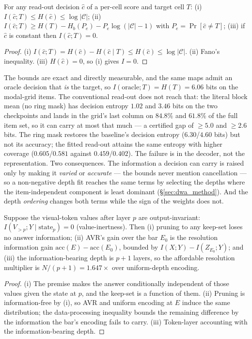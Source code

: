 \begin{theorem}\label{thm:info}
For any read-out decision $\hat c$ of a per-cell score and target cell $T$:
(i) $I(\hat c;T)\le H(\hat c)\le\log|\mathcal C|$;
(ii) $I(\hat c;T)\ge H(T)-H_b(P_e)-P_e\log(|\mathcal C|-1)$ with $P_e=\Pr[\hat c\ne T]$;
(iii) if $\hat c$ is constant then $I(\hat c;T)=0$.
\end{theorem}
\begin{proof}
(i) $I(\hat c;T)=H(\hat c)-H(\hat c\mid T)\le H(\hat c)\le\log|\mathcal C|$. (ii) Fano's inequality.
(iii) $H(\hat c)=0$, so (i) gives $I=0$.
\end{proof}

The bounds are exact and directly measurable, and the same maps admit an oracle decision that \emph{is} the target,
so $I(\text{oracle};T)=H(T)=6.06$ bits on the modal-grid items. The conventional read-out does not reach that: the
literal block mean (no ring mask) has decision entropy $1.02$ and $3.46$ bits on the two checkpoints and lands in
the grid's last column on $84.8\%$ and $61.8\%$ of the full item set, so it can carry at most that much --- a
certified gap of $\ge5.0$ and $\ge2.6$ bits. The ring mask restores the baseline's decision entropy ($6.30$/$4.60$
bits) but not its accuracy; the fitted read-out attains the same entropy with higher coverage ($0.605$/$0.581$
against $0.459$/$0.402$). The failure is in the decoder, not the representation. Two consequences. The information
a decision can carry is raised only by making it \emph{varied} or \emph{accurate} --- the bounds never mention
cancellation --- so a non-negative depth fit reaches the same terms by selecting the depths where the
item-independent component is least dominant (\S\ref{sec:dwa_method}). And the depth \emph{ordering} changes both terms
while the sign of the weights does not.

\begin{theorem}\label{thm:horizon}
Suppose the visual-token values after layer $p$ are output-invariant:
$I(V_{>p};Y\mid\text{state}_p)=0$ (value-inertness). Then (i) pruning to any keep-set loses no answer
information; (ii) AVR's gain over the bar $E_0$ is the resolution information gain
$\mathrm{acc}(E)-\mathrm{acc}(E_0)$, bounded by $I(X;Y)-I(Z_{E_0};Y)$; and (iii) the information-bearing depth is
$p+1$ layers, so the affordable resolution multiplier is $N/(p+1)=1.647\times$ over uniform-depth encoding.
\end{theorem}
\begin{proof}
(i) The premise makes the answer conditionally independent of those values given the state at $p$, and the keep-set
is a function of them. (ii) Pruning is information-free by (i), so AVR and uniform encoding at $E$ induce the same
distribution; the data-processing inequality bounds the remaining difference by the information the bar's encoding
fails to carry. (iii) Token-layer accounting with the information-bearing depth.
\end{proof}

